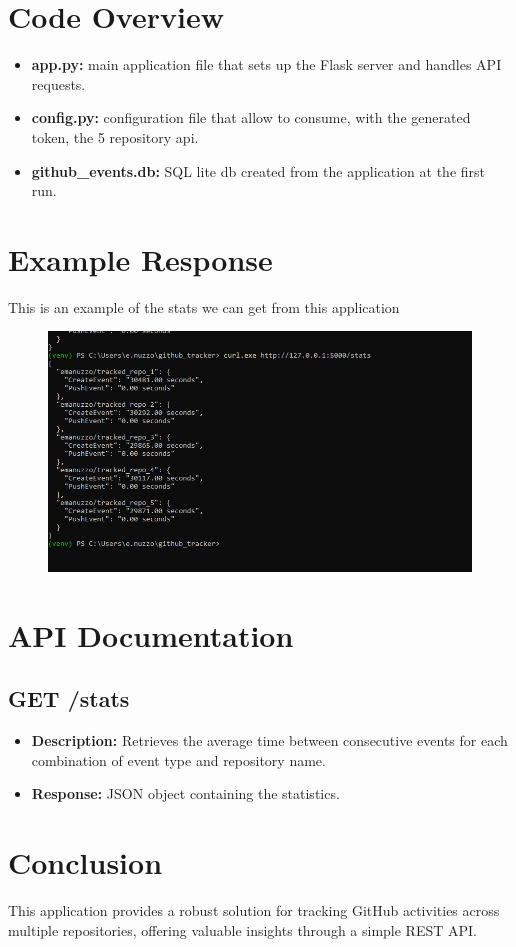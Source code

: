 \documentclass{article}
\begin{document}
\section{Code Overview}
\begin{itemize}
    \item \textbf{app.py:} main application file that sets up the Flask server and handles API requests.
    \item \textbf{config.py:} configuration file that allow to consume, with the generated token, the 5 repository api. 
    \item \textbf{github\_events.db:} SQL lite db created from the application at the first run.
\end{itemize}

\section{Example Response}
This is an example of the stats we can get from this application
\clearpage

\begin{figure}
    \centering
    \includegraphics[width=0.5\linewidth]{image.png}
\end{figure}

\section{API Documentation}
\subsection{GET /stats}
\begin{itemize}
    \item \textbf{Description:} Retrieves the average time between consecutive events for each combination of event type and repository name.
    \item \textbf{Response:} JSON object containing the statistics.
\end{itemize}

\section{Conclusion}
This application provides a robust solution for tracking GitHub activities across multiple repositories, offering valuable insights through a simple REST API.
\end{document}
